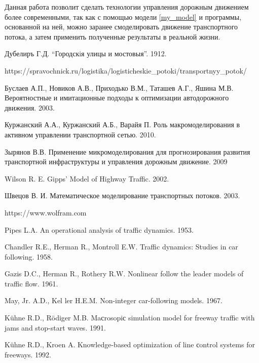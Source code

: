 \documentclass[12pt, a4paper]{extarticle}
\numberwithin{equation}{section}
\numberwithin{figure}{section}
\begin{document}
Данная работа позволит сделать технологии управления дорожным движением более современными, так как с помощью модели \eqref{my_model} и программы, основанной на ней, можно заранее смоделировать движение транспортного потока, а затем применить полученные результаты в реальной жизни.
\newpage

\begin{thebibliography}{**}
	Дубелиръ Г.Д. ``Городскiя улицы и мостовыя''. 1912.
	
	https://spravochnick.ru/logistika/logisticheskie\_potoki/transportnyy\_potok/
	
	Буслаев А.П., Новиков А.В., Приходько В.М., Таташев А.Г., Яшина М.В. Вероятностные и имитационные подходы к оптимизации автодорожного движения. 2003.
	
	Куржанский А.А., Куржанский А.Б., Варайя П. Роль макромоделирования в активном управлении транспортной сетью. 2010.
	
	Зырянов В.В. Применение микромоделирования для прогнозирования развития транспортной инфраструктуры и управления дорожным движение. 2009
	
	Wilson R. E. Gipps’ Model of Highway Traffic. 2002.
	
	Швецов В. И. Математическое моделирование транспортных потоков. 2003. 
	
	https://www.wolfram.com
	
	Pipes L.A. An operational analysis of traffic dynamics. 1953. 
		
	Chandler R.E., Herman R., Montroll E.W. Traffic dynamics: Studies in car following. 1958.

	Gazis D.C., Herman R., Rothery R.W. Nonlinear follow the leader models of traffic flow. 1961.
	
	May, Jr. A.D., Kel ler H.E.M. Non-integer car-following models. 1967.
	
	K\"{u}hne R.D., R\"{o}diger M.B. Maсrosopiс simulation model for freeway traffic with jams
	and stop-start waves. 1991.
	
	K\"{u}hne R.D., Kroen A. Knowledge-based optimization of line сontrol systems for freeways. 1992.


\end{thebibliography}
\end{document}
